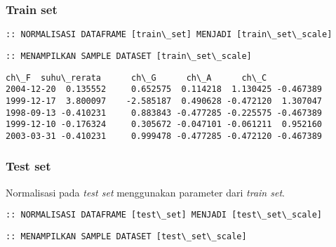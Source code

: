 \documentclass[11pt]{article}
\makeatletter
\newcommand{\boxspacing}{\kern\kvtcb@left@rule\kern\kvtcb@boxsep}
\newcommand{\prompt}[4]{
        \ttfamily\llap{{\color{#2}[#3]:\hspace{3pt}#4}}\vspace{-\baselineskip}
    }
\makeatother
\begin{document}
    \hypertarget{train-set}{%
\subsubsection{Train set}\label{train-set}}

    \begin{Verbatim}[commandchars=\\\{\}]
:: NORMALISASI DATAFRAME [train\_set] MENJADI [train\_set\_scale]
    \end{Verbatim}

    \begin{Verbatim}[commandchars=\\\{\}]
:: MENAMPILKAN SAMPLE DATASET [train\_set\_scale]
    \end{Verbatim}

            \begin{tcolorbox}[breakable, size=fbox, boxrule=.5pt, pad at break*=1mm, opacityfill=0]
\prompt{Out}{outcolor}{43}{\boxspacing}
\begin{Verbatim}[commandchars=\\\{\}]
                ch\_F  suhu\_rerata      ch\_G      ch\_A      ch\_C
2004-12-20  0.135552     0.652575  0.114218  1.130425 -0.467389
1999-12-17  3.800097    -2.585187  0.490628 -0.472120  1.307047
1998-09-13 -0.410231     0.883843 -0.477285 -0.225575 -0.467389
1999-12-10 -0.176324     0.305672 -0.047101 -0.061211  0.952160
2003-03-31 -0.410231     0.999478 -0.477285 -0.472120 -0.467389
\end{Verbatim}
\end{tcolorbox}
        
    \hypertarget{test-set}{%
\subsubsection{Test set}\label{test-set}}

Normalisasi pada \emph{test set} menggunakan parameter dari \emph{train
set}.

    \begin{Verbatim}[commandchars=\\\{\}]
:: NORMALISASI DATAFRAME [test\_set] MENJADI [test\_set\_scale]
    \end{Verbatim}

    \begin{Verbatim}[commandchars=\\\{\}]
:: MENAMPILKAN SAMPLE DATASET [test\_set\_scale]
    \end{Verbatim}
\end{document}
